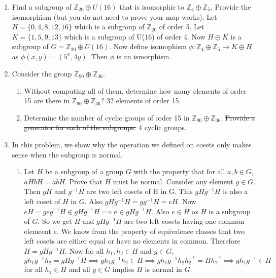 \documentclass{article}
\newcommand{\ZZ}{\mathbb{Z}}
\begin{document}


\begin{enumerate}

\item Find a subgroup of $\ZZ_{20} \oplus U(16)$ that is isomorphic to $\ZZ_4\oplus\ZZ_5$. Provide the isomorphism (but you do not need to prove your map works). Let $H = \{0,4,8,12,16\}$ which is a subgroup of $\ZZ_{20}$ of order 5. Let $K = \{1,5,9,13\}$ which is a subgroup of U(16) of order 4. Now $H \oplus K$ is a subgroup of $G= \ZZ_{20} \oplus U(16)$. Now define isomophism $\phi : \ZZ_{4} \oplus \ZZ_{5} \rightarrow K \oplus H$ as $\phi (x,y) = (5^{x},4y)$. Then $\phi$ is an ismorphism.

    
\item Consider the group $\ZZ_{90}\oplus\ZZ_{36}$.
    \begin{enumerate}
        \item Without computing all of them, determine how many elements of order 15 are there in $\ZZ_{90}\oplus\ZZ_{36}$? 32 elements of order 15. 
        
        
        \item Determine the number of cyclic groups of order 15 in $\ZZ_{90}\oplus\ZZ_{36}$. {\color{red}\st{Provide a generator for each of the subgroups.}} 4 cyclic groups.

    \end{enumerate}
    
    
\item In this problem, we show why the operation we defined on cosets only makes sense when the subgroup is normal. 
    \begin{enumerate} 
        \item Let $H$ be a subgroup of a group $G$ with the property that for all $a,b\in G$, $aHbH=abH$. Prove that $H$ must be normal. Consider any element $g \in G$. Then $gH$ and $g^{-1} H$ are two left cosets of H in G. This $gHg^{-1}H$ is also a left coset of $H$ in $G$. Also  $gHg^{-1}H = g g^{-1} H = e H$. Now $eH = geg^{-1} H \in gHg^{-1}H \implies e \in gHg^{-1}H$. Also $e \in H$ as $H$ is a subgroup of $G$. So we get $H$ and $gHg^{-1}H$ are two left cosets having one common elemeent $e$. We know from the property of equivalence classes that two left cosets are either equal or have no elements in common. Therefore $H = gHg^{-1}H$. Now for all $h_1, h_2 \in H$ and $g \in G$, $gh_1g^{-1}h_2 = gHg^{-1}H \implies gh_1g^{-1}h_2 \in H \implies gh_1g^{-1}h_2h^{-1}_{2} = Hh_{2}^{-1} \implies gh_1g^{-1} \in H$ for all $h_1 \in H$ and all $g \in G$ implies $H$ is normal in $G$. 
        

\end{enumerate}
\end{enumerate}
\end{document}
